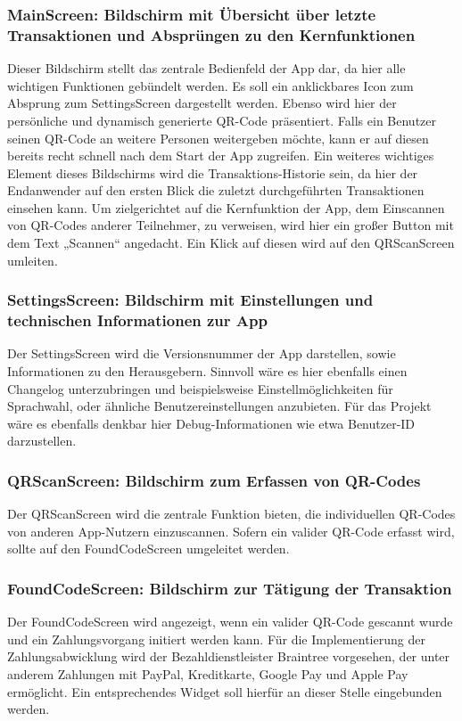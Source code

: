   \subsubsection*{MainScreen: Bildschirm mit Übersicht über letzte Transaktionen und Absprüngen zu den Kernfunktionen}
  Dieser Bildschirm stellt das zentrale Bedienfeld der App dar, da hier alle wichtigen Funktionen gebündelt werden.
  Es soll ein anklickbares Icon zum Absprung zum SettingsScreen dargestellt werden.
  Ebenso wird hier der persönliche und dynamisch generierte QR-Code präsentiert.
  Falls ein Benutzer seinen QR-Code an weitere Personen weitergeben möchte, kann er auf diesen bereits recht schnell nach dem Start der App zugreifen.
  Ein weiteres wichtiges Element dieses Bildschirms wird die Transaktions-Historie sein, da hier der Endanwender auf den ersten Blick die zuletzt durchgeführten Transaktionen einsehen kann.
  Um zielgerichtet auf die Kernfunktion der App, dem Einscannen von QR-Codes anderer Teilnehmer, zu verweisen, wird hier ein großer Button mit dem Text „Scannen“ angedacht.
  Ein Klick auf diesen wird auf den QRScanScreen umleiten.
  \subsubsection*{SettingsScreen: Bildschirm mit Einstellungen und technischen Informationen zur App}
  Der SettingsScreen wird die Versionsnummer der App darstellen, sowie Informationen zu den Herausgebern. Sinnvoll wäre es hier ebenfalls einen Changelog unterzubringen und beispielsweise Einstellmöglichkeiten für Sprachwahl, oder ähnliche Benutzereinstellungen anzubieten. Für das Projekt wäre es ebenfalls denkbar hier Debug-Informationen wie etwa Benutzer-ID darzustellen.
  \subsubsection*{QRScanScreen: Bildschirm zum Erfassen von QR-Codes}
  Der QRScanScreen wird die zentrale Funktion bieten, die individuellen QR-Codes von anderen App-Nutzern einzuscannen.
  Sofern ein valider QR-Code erfasst wird, sollte auf den FoundCodeScreen umgeleitet werden.
  \subsubsection*{FoundCodeScreen: Bildschirm zur Tätigung der Transaktion}
  Der FoundCodeScreen wird angezeigt, wenn ein valider QR-Code gescannt wurde und ein Zahlungsvorgang initiert werden kann.
  Für die Implementierung der Zahlungsabwicklung wird der Bezahldienstleister Braintree vorgesehen, der unter anderem Zahlungen mit PayPal, Kreditkarte, Google Pay und Apple Pay ermöglicht.
  Ein entsprechendes Widget soll hierfür an dieser Stelle eingebunden werden.
